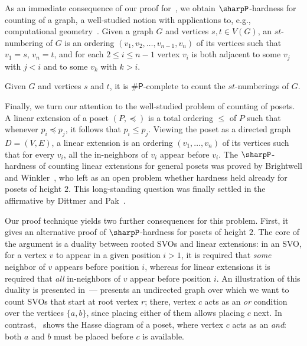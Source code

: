 \documentclass[11pt]{amsart}
\begin{document}
As an immediate consequence of our proof for~, we obtain $\sharpP$-hardness for counting  of a graph, a well-studied notion with applications to, e.g., computational geometry~\cite{Papamanthou}. Given a graph $G$ and vertices $s, t \in V(G)$, an $st$-numbering of $G$ is an ordering $(v_1, v_2, \dots, v_{n-1}, v_n)$ of its vertices such that $v_1 = s$, $v_n = t$, and for each $2 \leq i \leq n-1$ vertex $v_i$ is both adjacent to some $v_j$ with $j < i$ and to some $v_k$ with $k > i$.

\begin{corollary}\label{cor:st-numberings}
    Given $G$ and vertices $s$ and $t$, it is $\#\mathsf{P}$-complete to count the $st$-numberings of $G$.
\end{corollary}

Finally, we turn our attention to the well-studied problem of counting  of posets. A linear extension of a poset $(P, \preceq)$ is a total ordering $\leq$ of $P$ such that whenever $p_i \preceq p_j$, it follows that $p_i \leq p_j$. Viewing the poset as a directed graph $D = (V, E)$, a linear extension is an ordering $(v_1, \dots, v_n)$ of its vertices such that for every $v_i$, all the in-neighbors of $v_i$ appear before $v_i$.
The $\sharpP$-hardness of counting linear extensions for general posets was proved by Brightwell and Winkler~\cite{BrightwellWinkler}, who left as an open problem whether hardness held already for posets of height $2$. This long-standing question was finally settled in the affirmative by Dittmer and Pak~\cite{Dittmer_Pak_2020}.

Our proof technique yields two further consequences for this problem. First, it gives an alternative proof of $\sharpP$-hardness for posets of height $2$. The core of the argument is a duality between rooted SVOs and linear extensions: in an SVO, for a vertex $v$ to appear in a given position $i > 1$, it is required that \emph{some} neighbor of $v$ appears before position $i$, whereas for linear extensions it is required that \emph{all} in-neighbors of $v$ appear before position $i$. An illustration of this duality is presented in~--- presents an undirected graph over which we want to count SVOs that start at root vertex $r$; there, vertex $c$ acts as an \emph{or} condition over the vertices $\{a, b\}$, since placing either of them allows placing $c$ next. In contrast,~ shows the Hasse diagram of a poset, where vertex $c$ acts as an \emph{and}: both $a$ and $b$ must be placed before $c$ is available.
\end{document}
